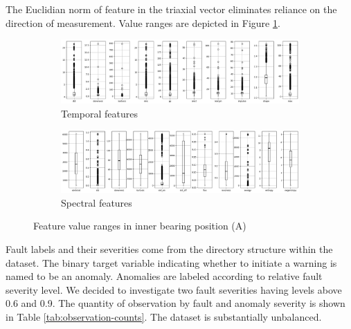 The Euclidian norm of feature in the triaxial vector eliminates reliance on the direction of measurement. Value ranges are depicted in Figure \ref{fig:design:feature-range}. 


\begin{figure}[ht]
    \centering
    \begin{subfigure}[b]{\textwidth}
        \includegraphics[width=\textwidth]{assets/design/feature-range-temporal.png}
        \caption{Temporal features}
    \end{subfigure}
    \hfill
    \begin{subfigure}[b]{\textwidth}
        \includegraphics[width=\textwidth]{assets/design/feature-range-spectral.png}
        \caption{Spectral features}
    \end{subfigure}
    \caption{Feature value ranges in inner bearing position (A)}
    \label{fig:design:feature-range}
\end{figure}

Fault labels and their severities come from the directory structure within the dataset. The binary target variable indicating whether to initiate a warning is named to be an anomaly. Anomalies are labeled according to relative fault severity level. We decided to investigate two fault severities having levels above 0.6 and 0.9. The quantity of observation by fault and anomaly severity is shown in Table \ref{tab:observation-counts}. The dataset is substantially unbalanced.

